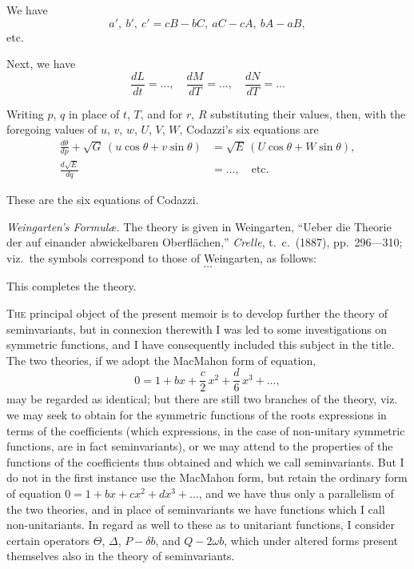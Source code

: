 \documentclass[11pt,a4paper]{book}
\begin{document}
We have
\[
a',\ b',\ c' = cB - bC,\ aC - cA,\ bA - aB,
\]
etc.

Next, we have
\[
\frac{dL}{dt} = \ldots, \quad \frac{dM}{dT} = \ldots, \quad \frac{dN}{dT} = \ldots
\]

Writing $p$, $q$ in place of $t$, $T$, and for $r$, $R$ substituting their values, then, with
the foregoing values of $u$, $v$, $w$, $U$, $V$, $W$, Codazzi's six equations are
\begin{align*}
\frac{d\theta}{dp} + \sqrt{G}\,(u\cos\theta + v\sin\theta) &= \sqrt{E}\,(U\cos\theta + W\sin\theta),\\
\frac{d\sqrt{E}}{dq} &= \ldots, \quad \text{etc.}
\end{align*}

These are the six equations of Codazzi.

\textit{Weingarten's Formul\ae.} The theory is given in Weingarten,
``Ueber die Theorie der auf einander abwickelbaren Oberfl\"achen,''
\textit{Crelle}, t.\ c.\ (1887), pp.\ 296---310; viz.\ the symbols correspond to those of
Weingarten, as follows:
\[
\ldots
\]

This completes the theory.

\newpage

\begin{flushright}
\end{flushright}

\textsc{The} principal object of the present memoir is to develop further the theory of
seminvariants, but in connexion therewith I was led to some investigations on
symmetric functions, and I have consequently included this subject in the title. The
two theories, if we adopt the MacMahon form of equation,
\[
0 = 1 + bx + \frac{c}{2}\,x^2 + \frac{d}{6}\,x^3 + \ldots,
\]
may be regarded as identical; but there are still two branches of the theory, viz.
we may seek to obtain for the symmetric functions of the roots expressions in terms
of the coefficients (which expressions, in the case of non-unitary symmetric functions,
are in fact seminvariants), or we may attend to the properties of the functions of
the coefficients thus obtained and which we call seminvariants. But I do not in
the first instance use the MacMahon form, but retain the ordinary form of equation
$0 = 1 + bx + cx^2 + dx^3 + \ldots$, and we have thus only a parallelism of the two theories,
and in place of seminvariants we have functions which I call non-unitariants. In
regard as well to these as to unitariant functions, I consider certain operators
$\Theta$, $\Delta$, $P - \delta b$, and $Q - 2\omega b$, which under altered forms present themselves also in
the theory of seminvariants.
\end{document}
